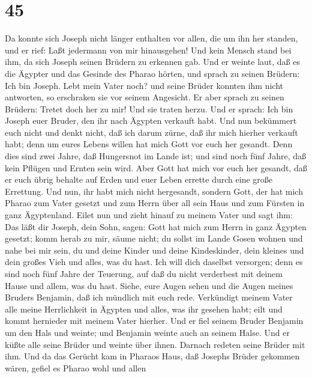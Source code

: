 \hypertarget{section-44}{%
\section{45}\label{section-44}}

 Da konnte sich Joseph nicht länger enthalten vor allen, die
um ihn her standen, und er rief: Laßt jedermann von mir hinausgehen! Und
kein Mensch stand bei ihm, da sich Joseph seinen Brüdern zu erkennen
gab.  Und er weinte laut, daß es die Ägypter und das Gesinde
des Pharao hörten,  und sprach zu seinen Brüdern: Ich bin
Joseph. Lebt mein Vater noch? und seine Brüder konnten ihm nicht
antworten, so erschraken sie vor seinem Angesicht.  Er aber
sprach zu seinen Brüdern: Tretet doch her zu mir! Und sie traten herzu.
Und er sprach: Ich bin Joseph euer Bruder, den ihr nach Ägypten verkauft
habt.  Und nun bekümmert euch nicht und denkt nicht, daß ich
darum zürne, daß ihr mich hierher verkauft habt; denn um eures Lebens
willen hat mich Gott vor euch her gesandt.  Denn dies sind
zwei Jahre, daß Hungersnot im Lande ist; und sind noch fünf Jahre, daß
kein Pflügen und Ernten sein wird.  Aber Gott hat mich vor
euch her gesandt, daß er euch übrig behalte auf Erden und euer Leben
errette durch eine große Errettung.  Und nun, ihr habt mich
nicht hergesandt, sondern Gott, der hat mich Pharao zum Vater gesetzt
und zum Herrn über all sein Haus und zum Fürsten in ganz Ägyptenland.
 Eilet nun und zieht hinauf zu meinem Vater und sagt ihm:
Das läßt dir Joseph, dein Sohn, sagen: Gott hat mich zum Herrn in ganz
Ägypten gesetzt; komm herab zu mir, säume nicht;  du sollst
im Lande Gosen wohnen und nahe bei mir sein, du und deine Kinder und
deine Kindeskinder, dein kleines und dein großes Vieh und alles, was du
hast.  Ich will dich daselbst versorgen; denn es sind noch
fünf Jahre der Teuerung, auf daß du nicht verderbest mit deinem Hause
und allem, was du hast.  Siehe, eure Augen sehen und die
Augen meines Bruders Benjamin, daß ich mündlich mit euch rede.
 Verkündigt meinem Vater alle meine Herrlichkeit in Ägypten
und alles, was ihr gesehen habt; eilt und kommt hernieder mit meinem
Vater hierher.  Und er fiel seinem Bruder Benjamin um den
Hals und weinte; und Benjamin weinte auch an seinem Halse. 
Und er küßte alle seine Brüder und weinte über ihnen. Darnach redeten
seine Brüder mit ihm.  Und da das Gerücht kam in Pharaos
Haus, daß Josephs Brüder gekommen wären, gefiel es Pharao wohl und allen
